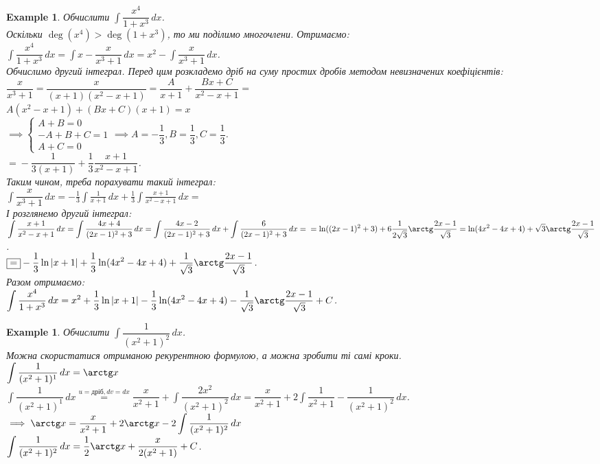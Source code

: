 \documentclass[a4paper, 10pt]{article}
\def\huge{\displaystyle}
\theoremstyle{theoremdd}
\theoremstyle{theoremdd}
\theoremstyle{theoremdd}
\theoremstyle{theoremdd}
\theoremstyle{theoremdd}
\newtheorem{example}[theorem]{Example}
\theoremstyle{theoremdd}
\theoremstyle{theoremdd}
\theoremstyle{theoremdd}
\theoremstyle{theoremdd}
\begin{document}
\begin{example}
Обчислити $\huge \int \dfrac{x^4}{1+x^3}\,dx$.\\
Оскільки $\deg(x^4) > \deg(1+x^3)$, то ми поділимо многочлени. Отримаємо:\\
$\huge \int \dfrac{x^4}{1+x^3}\,dx = \int x - \dfrac{x}{x^3+1}\,dx = x^2 - \int \dfrac{x}{x^3+1}\,dx$.\\
Обчислимо другий інтеграл. Перед цим розкладемо дріб на суму простих дробів методом невизначених коефіцієнтів:\\
$\dfrac{x}{x^3+1} = \dfrac{x}{(x+1)(x^2-x+1)} = \dfrac{A}{x+1} + \dfrac{Bx+C}{x^2-x+1} \boxed{=}$\\
$A(x^2-x+1) + (Bx+C)(x+1) = x$\\
$\implies \begin{cases}
A + B = 0 \\
-A + B + C = 1\\
A + C = 0
\end{cases} \implies A = -\dfrac{1}{3}, B = \dfrac{1}{3}, C = \dfrac{1}{3}$.\\
$\boxed{=} -\dfrac{1}{3(x+1)} + \dfrac{1}{3} \dfrac{x+1}{x^2-x+1}$.\\
Таким чином, треба порахувати такий інтеграл:\\
$\huge \int \dfrac{x}{x^3+1}\,dx = -\frac{1}{3} \int \frac{1}{x+1}\,dx + \frac{1}{3} \int \frac{x+1}{x^2-x+1}\,dx \boxed{=}$\\
І розглянемо другий інтеграл:\\
$\huge \int \frac{x+1}{x^2-x+1}\,dx = \int \frac{4x+4}{(2x-1)^2 + 3}\,dx = \int \frac{4x-2}{(2x-1)^2 +3}\,dx + \int \frac{6}{(2x-1)^2 +3}\,dx = \\ = \ln((2x-1)^2+3) + 6 \dfrac{1}{2\sqrt{3}} \arctg \dfrac{2x-1}{\sqrt{3}} = \ln(4x^2-4x+4) + \sqrt{3} \arctg \dfrac{2x-1}{\sqrt{3}}$.\\
$\boxed{=} \huge -\dfrac{1}{3} \ln|x+1| + \dfrac{1}{3} \ln(4x^2-4x+4) + \dfrac{1}{\sqrt{3}} \arctg \dfrac{2x-1}{\sqrt{3}}$.\\
Разом отримаємо:\\
$\huge \int \dfrac{x^4}{1+x^3}\,dx = x^2 + \dfrac{1}{3} \ln|x+1| - \dfrac{1}{3} \ln(4x^2-4x+4) - \dfrac{1}{\sqrt{3}} \arctg \dfrac{2x-1}{\sqrt{3}} + C$.
\end{example}

\begin{example}
Обчислити $\huge\int \dfrac{1}{(x^2+1)^2}\,dx$.\\
Можна скористатися отриманою рекурентною формулою, а можна зробити ті самі кроки.\\
$\huge \int \dfrac{1}{(x^2+1)^1}\,dx = \arctg x$\\
$\huge \int \dfrac{1}{(x^2+1)^1}\,dx \overset{u=\text{дріб}, dv = dx}{=} \dfrac{x}{x^2+1} + \int \dfrac{2x^2}{(x^2+1)^2}\,dx = \dfrac{x}{x^2+1} + 2\int \dfrac{1}{x^2+1} - \dfrac{1}{(x^2+1)^2}\,dx$.\\
$\implies \huge \arctg x = \dfrac{x}{x^2+1} + 2\arctg x - 2 \int \dfrac{1}{(x^2+1)^2}\,dx$\\
$\huge\int \dfrac{1}{(x^2+1)^2}\,dx = \dfrac{1}{2} \arctg x + \dfrac{x}{2(x^2+1)} + C$.
\end{example}
\end{document}
